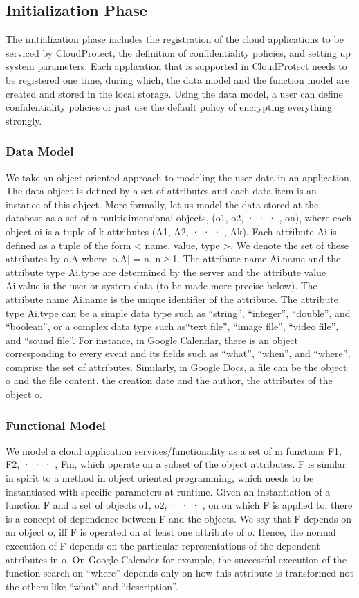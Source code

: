\documentclass[11pt,onecolumn]{article}
\begin{document}
\subsection{Initialization Phase}
The initialization phase includes the registration of the cloud applications to be serviced
by CloudProtect, the definition of confidentiality policies, and setting up system
parameters. Each application that is supported in CloudProtect needs to be registered
one time, during which, the data model and the function model are created and stored
in the local storage. Using the data model, a user can define confidentiality policies
or just use the default policy of encrypting everything strongly.
\subsubsection{Data Model}
We take an object oriented approach to modeling the user data in an application.
The data object is defined by a set of attributes and each data item is an instance
of this object. More formally, let us model the data stored at the database as a
set of n multidimensional objects, (o1, o2, · · · , on), where each object oi is a tuple of
k attributes (A1, A2, · · · , Ak). Each attribute Ai is defined as a tuple of the form < name, value, type >. We denote the set of these attributes by o.A where |o.A| = n,
n ≥ 1. The attribute name Ai.name and the attribute type Ai.type are determined by
the server and the attribute value Ai.value is the user or system data (to be made more
precise below). The attribute name Ai.name is the unique identifier of the attribute.
The attribute type Ai.type can be a simple data type such as “string”, “integer”,
“double”, and “boolean”, or a complex data type such as“text file”, “image file”,
“video file”, and “sound file”. For instance, in Google Calendar, there is an object
corresponding to every event and its fields such as “what”, “when”, and “where”,
comprise the set of attributes. Similarly, in Google Docs, a file can be the object o
and the file content, the creation date and the author, the attributes of the object o.
\subsubsection{Functional Model}
We model a cloud application services/functionality as a set of m functions
{F1, F2, · · · , Fm}, which operate on a subset of the object attributes. F is similar in
spirit to a method in object oriented programming, which needs to be instantiated
with specific parameters at runtime. Given an instantiation of a function F and a set
of objects {o1, o2, · · · , on} on which F is applied to, there is a concept of dependence
between F and the objects. We say that F depends on an object o, iff F is operated
on at least one attribute of o. Hence, the normal execution of F depends on the
particular representations of the dependent attributes in o. On Google Calendar for
example, the successful execution of the function search on “where” depends only on
how this attribute is transformed not the others like “what” and “description”.
\end{document}
